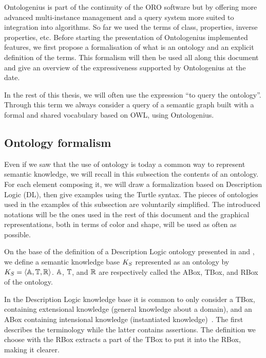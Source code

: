 Ontologenius is part of the continuity of the ORO software but by offering more advanced multi-instance management and a query system more suited to integration into algorithms. So far we used the terms of class, properties, inverse properties, etc. Before starting the presentation of Ontologenius implemented features, we first propose a formalisation of what is an ontology and an explicit definition of the terms. This formalism will then be used all along this document and give an overview of the expressiveness supported by Ontologenius at the date.

In the rest of this thesis, we will often use the expression ``to query the ontology''. Through this term we always consider a query of a semantic graph built with a formal and shared vocabulary based on OWL, using Ontologenius.

\subsection{Ontology formalism}
\label{sec:kb_formalism}

Even if we saw that the use of ontology is today a common way to represent semantic knowledge, we will recall in this subsection the contents of an ontology. For each element composing it, we will draw a formalization based on Description Logic (DL), then give examples using the Turtle syntax. The pieces of ontologies used in the examples of this subsection are voluntarily simplified. The introduced notations will be the ones used in the rest of this document and the graphical representations, both in terms of color and shape, will be used as often as possible.

On the base of the definition of a Description Logic ontology presented in \cite{fokoue_2006_summary} and \cite{krotzsch_2013_description}, we define a semantic knowledge base $K_S$ represented as an ontology by  $K_S = \langle \mathbb{A}, \mathbb{T}, \mathbb{R} \rangle$. $\mathbb{A}$, $\mathbb{T}$, and $\mathbb{R}$ are respectively called the ABox, TBox, and RBox of the ontology.

In the Description Logic knowledge base it is common to only consider a TBox, containing extensional knowledge (general knowledge about a domain), and an ABox containing intensional knowledge (instantiated knowledge)~\cite{baader_2003_description}. The first describes the terminology while the latter contains assertions. The definition we choose with the RBox extracts a part of the TBox to put it into the RBox, making it clearer.

